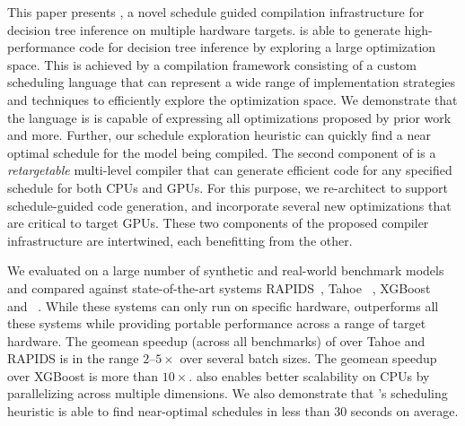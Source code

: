 This paper presents \Treebeard{}, a novel schedule guided compilation infrastructure
for decision tree inference on multiple hardware targets. \Treebeard{} is able to 
generate high-performance code for decision tree inference by exploring a large optimization space. 
This is achieved by a compilation framework consisting of a 
custom scheduling language that can represent a wide range of 
implementation strategies and techniques to efficiently explore
the optimization space. We demonstrate that the language is 
is capable of expressing all optimizations proposed by prior work and more.
Further, our schedule exploration heuristic can quickly find a near 
optimal schedule for the model being compiled. 
The second component of \Treebeard{} is a \emph{retargetable} multi-level compiler that can generate efficient code 
for any specified schedule for both CPUs and GPUs. For this purpose, we re-architect \TreebeardOLD{} to
support schedule-guided code generation, and incorporate several new optimizations that are critical to target GPUs. 
These two components of the proposed \Treebeard{} compiler infrastructure are intertwined, each benefitting from the other.

We evaluated \Treebeard{} on a large number of synthetic and real-world 
benchmark models and compared against state-of-the-art systems RAPIDS~\cite{RAPIDS}, Tahoe~\cite{Tahoe}
, XGBoost~\cite{XGBoost} and \TreebeardOLD{}~\cite{Treebeard}. While these systems can only run on 
specific hardware, \Treebeard{} outperforms all these systems while providing portable performance across 
a range of target hardware. The geomean speedup (across all benchmarks) of \Treebeard{} over
Tahoe and RAPIDS is in the range $2$--$5\times$ over several batch sizes. The geomean speedup over
XGBoost is more than $10\times$. \Treebeard{} also enables better scalability on CPUs by parallelizing 
across multiple dimensions. We also demonstrate that \Treebeard{}'s scheduling heuristic is able to 
find near-optimal schedules in less than 30 seconds on average.

